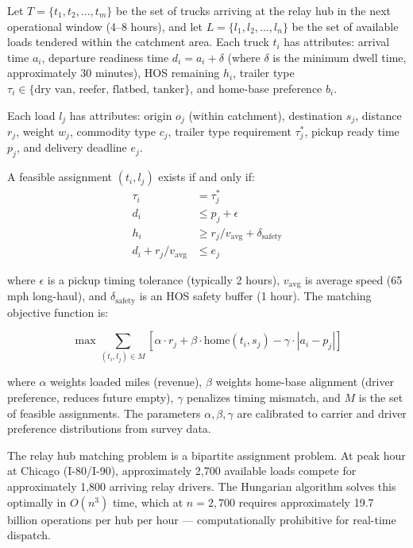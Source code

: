 Let $T = \{t_1, t_2, \ldots, t_m\}$ be the set of trucks arriving at the relay hub in the next operational window (4--8 hours), and let $L = \{l_1, l_2, \ldots, l_n\}$ be the set of available loads tendered within the catchment area. Each truck $t_i$ has attributes: arrival time $a_i$, departure readiness time $d_i = a_i + \delta$ (where $\delta$ is the minimum dwell time, approximately 30 minutes), HOS remaining $h_i$, trailer type $\tau_i \in \{\text{dry van, reefer, flatbed, tanker}\}$, and home-base preference $b_i$.

Each load $l_j$ has attributes: origin $o_j$ (within catchment), destination $s_j$, distance $r_j$, weight $w_j$, commodity type $c_j$, trailer type requirement $\tau_j^*$, pickup ready time $p_j$, and delivery deadline $e_j$.

A feasible assignment $(t_i, l_j)$ exists if and only if:
\begin{align}
  \tau_i &= \tau_j^* \label{eq:trailer} \\
  d_i &\leq p_j + \epsilon \label{eq:timing} \\
  h_i &\geq r_j / v_{\text{avg}} + \delta_{\text{safety}} \label{eq:hos} \\
  d_i + r_j / v_{\text{avg}} &\leq e_j \label{eq:deadline}
\end{align}

where $\epsilon$ is a pickup timing tolerance (typically 2 hours), $v_{\text{avg}}$ is average speed (65 mph long-haul), and $\delta_{\text{safety}}$ is an HOS safety buffer (1 hour). The matching objective function is:

\begin{equation}
  \max \sum_{(t_i, l_j) \in M} \left[ \alpha \cdot r_j + \beta \cdot \text{home}(t_i, s_j) - \gamma \cdot |a_i - p_j| \right]
  \label{eq:objective}
\end{equation}

where $\alpha$ weights loaded miles (revenue), $\beta$ weights home-base alignment (driver preference, reduces future empty), $\gamma$ penalizes timing mismatch, and $M$ is the set of feasible assignments. The parameters $\alpha, \beta, \gamma$ are calibrated to carrier and driver preference distributions from survey data.

The relay hub matching problem is a bipartite assignment problem. At peak hour at Chicago (I-80/I-90), approximately 2,700 available loads compete for approximately 1,800 arriving relay drivers. The Hungarian algorithm \citep{Kuhn1955} solves this optimally in $O(n^3)$ time, which at $n = 2{,}700$ requires approximately 19.7 billion operations per hub per hour --- computationally prohibitive for real-time dispatch.

